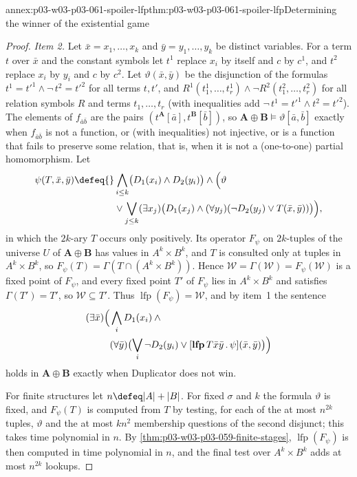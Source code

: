 \begin{annexitem}{annex:p03-w03-p03-061-spoiler-lfp}{thm:p03-w03-p03-061-spoiler-lfp}{Determining the winner of the existential game}
\begin{proof}
\emph{Item 2.} Let \(\bar x=x_1,\ldots,x_k\) and \(\bar y=y_1,\ldots,y_k\) be
distinct variables. For a term \(t\) over \(\bar x\) and the constant symbols
let \(t^1\) replace \(x_i\) by itself and \(c\) by \(c^1\), and \(t^2\)
replace \(x_i\) by \(y_i\) and \(c\) by \(c^2\). Let \(\vartheta(\bar x,\bar
y)\) be the disjunction of the formulas \(t^1=t'^1\wedge\neg\,t^2=t'^2\) for
all terms \(t,t'\), and
\(R^1(t_1^1,\ldots,t_r^1)\wedge\neg R^2(t_1^2,\ldots,t_r^2)\) for all
relation symbols \(R\) and terms \(t_1,\ldots,t_r\) (with inequalities add
\(\neg\,t^1=t'^1\wedge t^2=t'^2\)). The elements of
\(f_{\bar a\bar b}\) are the pairs \((t^{\mathbf A}[\bar a],t^{\mathbf
B}[\bar b])\), so \(\mathbf A\oplus\mathbf B\models\vartheta[\bar a,\bar b]\)
exactly when \(f_{\bar a\bar b}\) is not a function, or (with inequalities)
not injective, or is a function that fails to preserve some relation, that
is, when it is not a (one-to-one) partial homomorphism. Let
\[
\begin{aligned}
 \psi(T,\bar x,\bar y)\defeq{}&\bigwedge_{i\le k}\bigl(D_1(x_i)\wedge
 D_2(y_i)\bigr)\wedge\Bigl(\vartheta\\
 &\vee\bigvee_{j\le k}(\exists x_j)\bigl(
 D_1(x_j)\wedge(\forall y_j)(\neg D_2(y_j)\vee T(\bar x,\bar y))\bigr)\Bigr),
\end{aligned}
\]
in which the \(2k\)-ary \(T\) occurs only positively. Its operator
\(F_\psi\) on \(2k\)-tuples of the universe \(U\) of \(\mathbf A\oplus\mathbf
B\) has values in \(A^k\times B^k\), and \(T\) is consulted only at tuples in
\(A^k\times B^k\), so \(F_\psi(T)=\Gamma(T\cap(A^k\times B^k))\). Hence
\(\mathcal W=\Gamma(\mathcal W)=F_\psi(\mathcal W)\) is a fixed point of
\(F_\psi\), and every fixed point \(T'\) of \(F_\psi\) lies in
\(A^k\times B^k\) and satisfies \(\Gamma(T')=T'\), so \(\mathcal W\subseteq
T'\). Thus \(\operatorname{lfp}(F_\psi)=\mathcal W\), and by item~1 the
sentence
\[
\begin{aligned}
 (\exists\bar x)\Bigl(&\bigwedge_iD_1(x_i)\wedge{}\\
 &(\forall\bar y)\bigl(\bigvee_i\neg D_2(y_i)\vee[\mathbf{lfp}\,T\bar x\bar
 y\,.\,\psi](\bar x,\bar y)\bigr)\Bigr)
\end{aligned}
\]
holds in \(\mathbf A\oplus\mathbf B\) exactly when Duplicator does not win.

For finite structures let \(n\defeq|A|+|B|\). For fixed \(\sigma\) and \(k\)
the formula \(\vartheta\) is fixed, and \(F_\psi(T)\) is computed from \(T\)
by testing, for each of the at most \(n^{2k}\) tuples, \(\vartheta\) and the
at most \(kn^2\) membership questions of the second disjunct; this takes time
polynomial in \(n\). By \cref{thm:p03-w03-p03-059-finite-stages},
\(\operatorname{lfp}(F_\psi)\) is then computed in time polynomial in \(n\),
and the final test over \(A^k\times B^k\) adds at most \(n^{2k}\) lookups.


\end{proof}
\end{annexitem}
